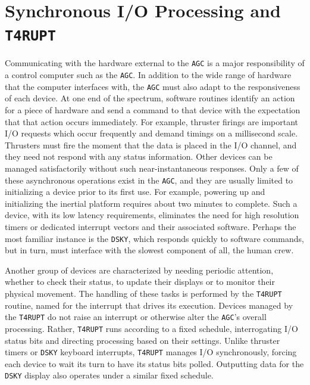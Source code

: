 \documentclass[refcap, oxford]{ahsan}
\begin{document}
\section{Synchronous I/O Processing and \texttt{T4RUPT}}

Communicating with the hardware external to the \texttt{AGC} is a major responsibility of a control computer such as the \texttt{AGC}. In addition to the wide range of hardware that the computer interfaces with, the \texttt{AGC} must also adapt to the responsiveness of each device. At one end of the spectrum, software routines identify an action for a piece of hardware and send a command to that device with the expectation that that action occurs immediately. For example, thruster firings are important I/O requests which occur frequently and demand timings on a millisecond scale. Thrusters must fire the moment that the data is placed in the I/O channel, and they need not respond with any status information. Other devices can be managed satisfactorily without such near-instantaneous responses. Only a few of these asynchronous operations exist in the \texttt{AGC}, and they are usually limited to initializing a device prior to its first use. For example, powering up and initializing the inertial platform requires about two minutes to complete. Such a device, with its low latency requirements, eliminates the need for high resolution timers or dedicated interrupt vectors and their associated software. Perhaps the most familiar instance is the \texttt{DSKY}, which responds quickly to software commands, but in turn, must interface with the slowest component of all, the human crew.

Another group of devices are characterized by needing periodic attention, whether to check their status, to update their displays or to monitor their physical movement. The handling of these tasks is performed by the \texttt{T4RUPT} routine, named for the interrupt that drives its execution. Devices managed by the \texttt{T4RUPT} do not raise an interrupt or otherwise alter the \texttt{AGC}'s overall processing. Rather, \texttt{T4RUPT} runs according to a fixed schedule, interrogating I/O status bits and directing processing based on their settings. Unlike thruster timers or \texttt{DSKY} keyboard interrupts, \texttt{T4RUPT} manages I/O synchronously, forcing each device to wait its turn to have its status bits polled. Outputting data for the \texttt{DSKY} display also operates under a similar fixed schedule.
\end{document}
